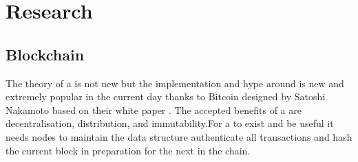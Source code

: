 \section{Research}
\subsection{Blockchain}

%
%
%
%

The theory of a  is not new \cite{origins_blockchain} but the implementation and hype around  is new and extremely popular in the current day thanks to Bitcoin designed by Satoshi Nakamoto based on their white paper \cite{nakamoto2008bitcoin}. The accepted benefits of a  are decentralisation, distribution, and immutability.For a  to exist and be useful it needs nodes to maintain the data structure authenticate all transactions and hash the current block in preparation for the next in the chain.

